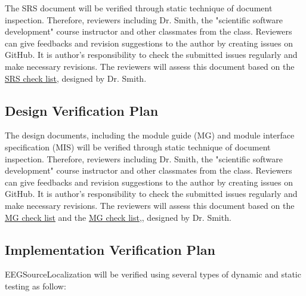 \documentclass[12pt, titlepage]{article}
\renewcommand{\progname}{EEGSourceLocalization}
\begin{document}
The SRS document will be verified through static technique of document inspection. Therefore, reviewers including Dr. Smith, the "scientific software development" course instructor and other classmates from the class. Reviewers can give feedbacks and revision suggestions to the author by creating issues on GitHub. It is author’s responsibility to check the submitted issues regularly and make necessary revisions. The reviewers will assess this document based on the \href{https://gitlab.cas.mcmaster.ca/smiths/cas741/-/blob/master/BlankProjectTemplate/docs/SRS/SRS-Checklist.pdf}{SRS check list}, designed by Dr. Smith.


\subsection{Design Verification Plan}

The design documents, including the module guide (MG) and module interface specification (MIS) will be verified through static technique of document inspection. Therefore, reviewers including Dr. Smith, the "scientific software development" course instructor and other classmates from the class. Reviewers can give feedbacks and revision suggestions to the author by creating issues on GitHub. It is author’s responsibility to check the submitted issues regularly and make necessary revisions. The reviewers will assess this document based on the \href{https://gitlab.cas.mcmaster.ca/smiths/cas741/-/blob/master/BlankProjectTemplate/docs/Design/MG/MG-Checklist.pdf}{MG check list} and the \href{https://gitlab.cas.mcmaster.ca/smiths/cas741/-/blob/master/BlankProjectTemplate/docs/Design/MIS/MIS-Checklist.pdf}{MG check list},, designed by Dr. Smith.


\subsection{Implementation Verification Plan}

\progname{} will be verified using several types of dynamic and static testing as follow:
\end{document}
